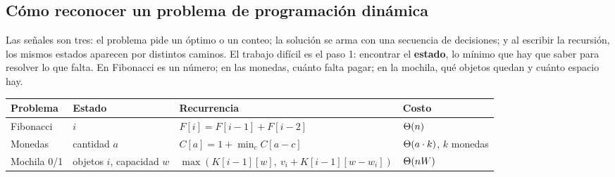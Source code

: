 \documentclass[11pt,letterpaper]{article}
\begin{document}
\subsection*{Cómo reconocer un problema de programación dinámica}

\begin{idea}
  Las señales son tres: el problema pide un óptimo o un conteo; la
  solución se arma con una secuencia de decisiones; y al escribir la
  recursión, los mismos estados aparecen por distintos caminos. El
  trabajo difícil es el paso 1: encontrar el \textbf{estado}, lo
  mínimo que hay que saber para resolver lo que falta. En Fibonacci es
  un número; en las monedas, cuánto falta pagar; en la mochila, qué
  objetos quedan y cuánto espacio hay.
\end{idea}

\begin{center}
\small
\begin{tabular}{l>{\raggedright\arraybackslash}p{2.6cm}%
                 >{\raggedright\arraybackslash}p{6.4cm}l}
  \toprule
  \textbf{Problema} & \textbf{Estado} & \textbf{Recurrencia}
    & \textbf{Costo} \\
  \midrule
  Fibonacci & $i$
            & $F[i] = F[i-1] + F[i-2]$ & $\Theta\!\left(n\right)$ \\
  \addlinespace
  Monedas & cantidad $a$
          & $C[a] = 1 + \min_{c} C[a - c]$
          & $\Theta\!\left(a \cdot k\right)$, $k$ monedas \\
  \addlinespace
  Mochila 0/1 & objetos $i$, capacidad $w$
              & $\max(K[i-1][w],\ v_i + K[i-1][w - w_i])$
              & $\Theta\!\left(n W\right)$ \\
  \bottomrule
\end{tabular}
\end{center}

\newpage


\label{sec:grafos}
\end{document}
